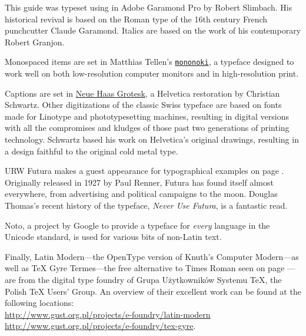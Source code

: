 This guide was typeset using \LuaLaTeX{} in Adobe Garamond Pro by
Robert Slimbach.
His historical revival is based on the Roman type of
the 16{th} century French
punchcutter Claude Garamond.
Italics are based on the work of his contemporary Robert Granjon.

Monospaced items are set in Matthias Tellen's
\href{https://madmalik.github.io/mononoki/}{\texttt{mononoki}},
a typeface designed to work well on both low-resolution computer monitors
and in high-resolution print.

Captions are set in
\href{http://www.fontbureau.com/NHG/}{\textsf{\small Neue Haas Grotesk}},
a Helvetica restoration by Christian Schwartz.
Other digitizations of the classic Swiss typeface are based on fonts made for
Linotype and phototypesetting machines,
resulting in digital versions with all the compromises and kludges of those
past two generations of printing technology.
Schwartz based his work on Helvetica's original drawings,
resulting in a design faithful to the original cold metal type.

{URW Futura}
makes a guest appearance
for typographical examples on page \pageref{typography}.
Originally released in 1927 by Paul Renner,
Futura has found itself almost everywhere,
from advertising and political campaigns to the moon.
Douglas Thomas's recent history of the typeface,
\textit{Never Use Futura}, is a fantastic read.

{Noto},
a project by Google to provide a typeface for \emph{every} language in the
Unicode standard,
is used for various bits of non-Latin text.

Finally,
Latin Modern---the OpenType version of Knuth's Computer Modern---as well
as {\TeX{} Gyre Termes}---the
free alternative to Times Roman seen on page \pageref{typography}---are from
the digital type foundry of Grupa Użytkowników Systemu \TeX{},
the Polish \TeX{} Users' Group.
An overview of their excellent work can be found at the following locations:\\
\url{http://www.gust.org.pl/projects/e-foundry/latin-modern} \\
\url{http://www.gust.org.pl/projects/e-foundry/tex-gyre}.
